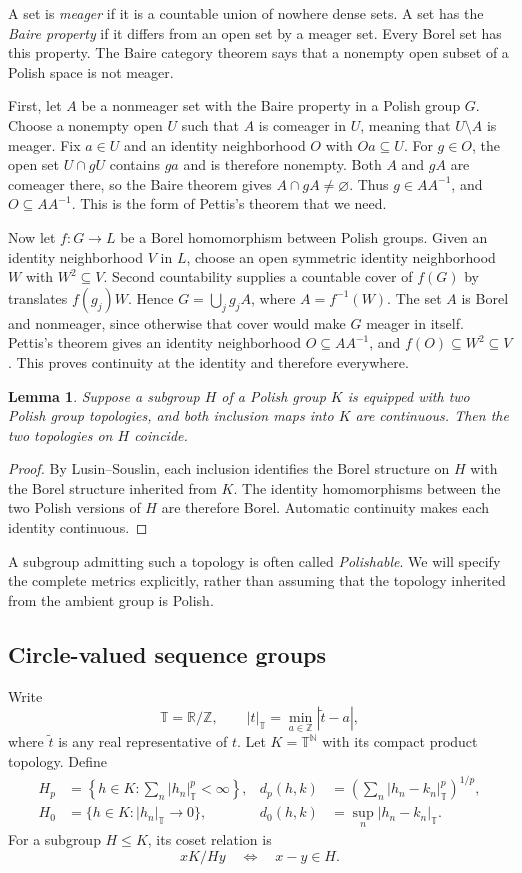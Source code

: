 \documentclass[11pt]{article}
\newtheorem{lemma}[theorem]{Lemma}
\theoremstyle{definition}
\newcommand{\N}{\mathbb N}
\newcommand{\R}{\mathbb R}
\newcommand{\Z}{\mathbb Z}
\newcommand{\T}{\mathbb T}
\begin{document}
A set is \emph{meager} if it is a countable union of nowhere dense sets.
A set has the \emph{Baire property} if it differs from an open set by a
meager set. Every Borel set has this property. The Baire category theorem
says that a nonempty open subset of a Polish space is not meager.

First, let $A$ be a nonmeager set with the Baire property in a Polish
group $G$. Choose a nonempty open $U$ such that $A$ is comeager in $U$,
meaning that $U\setminus A$ is meager. Fix $a\in U$ and an identity
neighborhood $O$ with $Oa\subseteq U$. For $g\in O$, the open set
$U\cap gU$ contains $ga$ and is therefore nonempty. Both $A$ and $gA$
are comeager there, so the Baire theorem gives $A\cap gA\ne\varnothing$.
Thus $g\in AA^{-1}$, and $O\subseteq AA^{-1}$. This is the form of
Pettis's theorem that we need.

Now let $f:G\to L$ be a Borel homomorphism between Polish groups. Given
an identity neighborhood $V$ in $L$, choose an open symmetric identity
neighborhood $W$ with $W^2\subseteq V$. Second countability supplies a
countable cover of $f(G)$ by translates $f(g_j)W$. Hence
$G=\bigcup_j g_j A$, where $A=f^{-1}(W)$. The set $A$ is Borel and
nonmeager, since otherwise that cover would make $G$ meager in itself.
Pettis's theorem gives an identity neighborhood $O\subseteq AA^{-1}$,
and $f(O)\subseteq W^2\subseteq V$. This proves continuity at the
identity and therefore everywhere.

\begin{lemma}\label{lem:unique-topology}
Suppose a subgroup $H$ of a Polish group $K$ is equipped with two Polish
group topologies, and both inclusion maps into $K$ are continuous.
Then the two topologies on $H$ coincide.
\end{lemma}
\begin{proof}
By Lusin--Souslin, each inclusion identifies the Borel structure on $H$
with the Borel structure inherited from $K$. The identity homomorphisms
between the two Polish versions of $H$ are therefore Borel. Automatic
continuity makes each identity continuous.
\end{proof}
A subgroup admitting such a topology is often called \emph{Polishable}.
We will specify the complete metrics explicitly, rather than assuming
that the topology inherited from the ambient group is Polish.

\subsection{Circle-valued sequence groups}
Write
\[
 \T=\R/\Z,\qquad
 |t|_{\T}=\min_{a\in\Z}|\widetilde t-a|,
\]
where $\widetilde t$ is any real representative of $t$.
Let $K=\T^\N$ with its compact product topology. Define
\begin{align*}
 H_p&=\left\{h\in K:\sum_n|h_n|_\T^p<\infty\right\},
 &d_p(h,k)&=\left(\sum_n|h_n-k_n|_\T^p\right)^{1/p},\\
 H_0&=\{h\in K:|h_n|_\T\to0\},
 &d_0(h,k)&=\sup_n|h_n-k_n|_\T.
\end{align*}
For a subgroup $H\le K$, its coset relation is
\[
 x\mathrel{K/H}y\quad\Longleftrightarrow\quad x-y\in H.
\]
\end{document}
